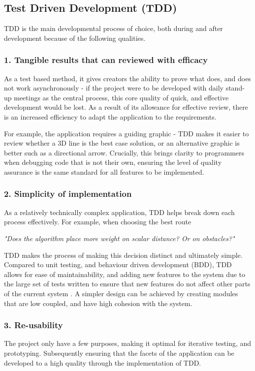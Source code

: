 
\subsection*{Test Driven Development (TDD)}
TDD is the main developmental process of choice, both during and after development because of the following qualities. 

\subsubsection{1. Tangible results that can reviewed with efficacy}
As a test based method, it gives creators the ability to prove what does, and does not work asynchronously - if the project were to be developed with daily stand-up meetings as the central process, this core quality of quick, and effective development would be lost. As a result of its allowance for effective review, there is an increased efficiency to adapt the application to the requirements. 

For example, the application requires a guiding graphic - TDD makes it easier to review whether a 3D line is the best case solution, or an alternative graphic is better such as a directional arrow. Crucially, this brings clarity to programmers when debugging code that is not their own, ensuring the level of quality assurance is the same standard for all features to be implemented.

\subsubsection{2. Simplicity of implementation}
As a relatively technically complex application, TDD helps break down each process effectively. For example, when choosing the best route 

\begin{displayquote}
\textit{"Does the algorithm place more weight on scalar distance? Or on obstacles?"}
\end{displayquote}

TDD makes the process of making this decision distinct and ultimately simple. Compared to unit testing, and behaviour driven development (BDD), TDD allows for ease of maintainability, and adding new features to the system due to the large set of tests written to ensure that new features do not affect other parts of the current system \cite{codeutopia}. A simpler design can be achieved by creating modules that are low coupled, and have high cohesion with the system.

\subsubsection{3. Re-usability}
The project only have a few purposes, making it optimal for iterative testing, and prototyping. Subsequently ensuring that the facets of the application can be developed to a high quality through the implementation of TDD.